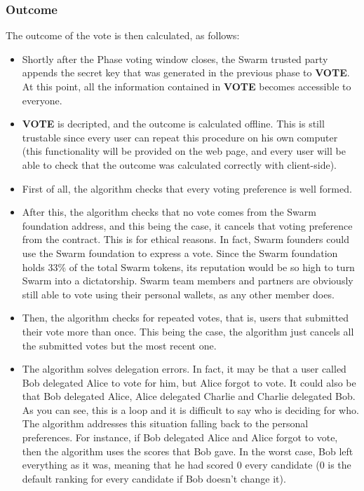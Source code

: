 \documentclass[submission, copyright,creativecommons,sharealike,noncommercial]{eptcs}
\newcommand{\Vote}{\textbf{VOTE}\xspace}
\begin{document}
\subsubsection{Outcome}\label{subsubsec:Intuitive Outcome}
%
		The outcome of the vote is then calculated, as follows:
		\begin{itemize}	
			\item Shortly after the Phase voting window closes, the Swarm trusted party appends the secret key that was generated in the previous phase to \Vote. At this point, all the information contained in \Vote becomes accessible to everyone.
			\item \Vote is decripted, and the outcome is calculated offline. This is still trustable since every user can repeat this procedure on his own computer (this functionality will be provided on the web page, and every user will be able to check that the outcome was calculated correctly with client-side).
			\item First of all, the algorithm checks that every voting preference is well formed.
			\item After this, the algorithm checks that no vote comes from the Swarm foundation address, and this being the case, it cancels that voting preference from the contract. This is for ethical reasons. In fact, Swarm founders could use the Swarm foundation to express a vote. Since the Swarm foundation holds 33\% of the total Swarm tokens, its reputation would be so high to turn Swarm into a dictatorship. Swarm team members and partners are obviously still able to vote using their personal wallets, as any other member does.
			\item Then, the algorithm checks for repeated votes, that is, users that submitted their vote more than once. This being the case, the algorithm just cancels all the submitted votes but the most recent one.
			\item The algorithm solves delegation errors. In fact, it may be that a user called Bob delegated Alice to vote for him, but Alice forgot to vote. It could also be that Bob delegated Alice, Alice delegated Charlie and Charlie delegated Bob. As you can see, this is a loop and it is difficult to say who is deciding for who. The algorithm addresses this situation falling back to the personal preferences. For instance, if Bob delegated Alice and Alice forgot to vote, then the algorithm uses the scores that Bob gave. In the worst case, Bob left everything as it was, meaning that he had scored $0$ every candidate ($0$ is the default ranking for every candidate if Bob doesn't change it).

\end{itemize}
\end{document}
